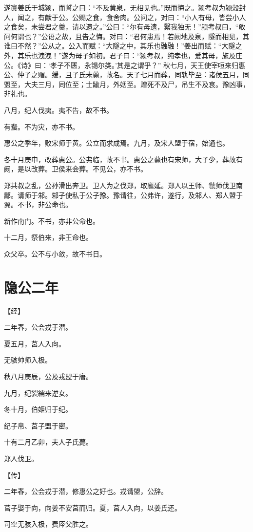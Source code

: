 \documentclass[a4paper,12pt,UTF8,twoside]{ctexbook}
\begin{document}
遂寘姜氏于城颍，而誓之曰：“不及黄泉，无相见也。”既而悔之。颍考叔为颍穀封人，闻之，有献于公。公赐之食，食舍肉。公问之，对曰：“小人有母，皆尝小人之食矣，未尝君之羹，请以遗之。”公曰：“尔有母遗，繄我独无！”颍考叔曰，“敢问何谓也？”公语之故，且告之悔。对曰：“君何患焉！若阙地及泉，隧而相见，其谁曰不然？”公从之。公入而赋：“大隧之中，其乐也融融！”姜出而赋：“大隧之外，其乐也洩洩！”遂为母子如初。君子曰：“颍考叔，纯孝也，爱其母，施及庄公。《诗》曰：‘孝子不匮，永锡尔类。’其是之谓乎？”
秋七月，天王使宰咺来归惠公、仲子之赗。缓，且子氏未薨，故名。天子七月而葬，同轨毕至：诸侯五月，同盟至，大夫三月，同位至；士踰月，外姻至。赠死不及尸，吊生不及哀。豫凶事，非礼也。

八月，纪人伐夷。夷不告，故不书。

有蜚。不为灾，亦不书。

惠公之季年，败宋师于黄。公立而求成焉。九月，及宋人盟于宿，始通也。

冬十月庚申，改葬惠公。公弗临，故不书。惠公之薨也有宋师，大子少，葬故有阙，是以改葬。卫侯来会葬。不见公，亦不书。

郑共叔之乱，公孙滑出奔卫。卫人为之伐郑，取廪延。郑人以王师、虢师伐卫南鄙。请师于邾。邾子使私于公子豫。豫请往，公弗许，遂行，及邾人、郑人盟于翼。不书，非公命也。

新作南门。不书，亦非公命也。

十二月，祭伯来，非王命也。

众父卒。公不与小敛，故不书日。

\chapter{隐公二年}

【经】

二年春，公会戎于潜。

夏五月，莒人入向。

无骇帅师入极。

秋八月庚辰，公及戎盟于唐。

九月，纪裂繻来逆女。

冬十月，伯姬归于纪。

纪子帛、莒子盟于密。

十有二月乙卯，夫人子氏薨。

郑人伐卫。

【传】

二年春，公会戎于潜，修惠公之好也。戎请盟，公辞。

莒子娶于向，向姜不安莒而归。夏，莒人入向，以姜氏还。

司空无骇入极，费庈父胜之。
\end{document}
